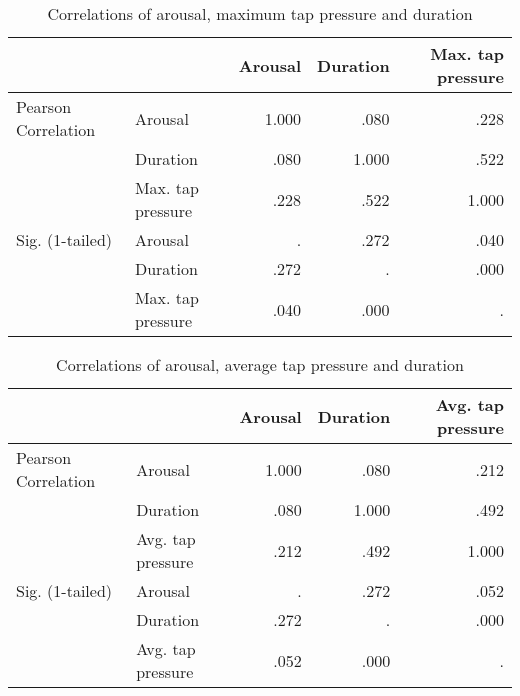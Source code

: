 \begin{table}[ht]
\centering
\begin{tabular}{@{}llrrr@{}}
                    &                   & Arousal & Duration & Max. tap pressure \\ \midrule
Pearson Correlation & Arousal           & 1.000   & .080     & .228              \\
                    & Duration          & .080    & 1.000    & .522              \\
                    & Max. tap pressure & .228    & .522     & 1.000             \\ \midrule
Sig. (1-tailed)     & Arousal           & .       & .272     & .040              \\
                    & Duration          & .272    & .        & .000              \\
                    & Max. tap pressure & .040    & .000     & .                
\end{tabular}
\caption{Correlations of arousal, maximum tap pressure and duration}
\label{tab:correlations_armax}
\end{table}

\par\bigskip

\begin{table}[!htbp]
\centering
\begin{tabular}{@{}llrrr@{}}
                    &                   & Arousal & Duration & Avg. tap pressure \\ \midrule
Pearson Correlation & Arousal           & 1.000   & .080     & .212              \\
                    & Duration          & .080    & 1.000    & .492              \\
                    & Avg. tap pressure & .212    & .492     & 1.000             \\ \midrule
Sig. (1-tailed)     & Arousal           & .       & .272     & .052              \\
                    & Duration          & .272    & .        & .000              \\
                    & Avg. tap pressure & .052    & .000     & .                
\end{tabular}
\caption{Correlations of arousal, average tap pressure and duration}
\label{tab:correlations_aravg}
\end{table}